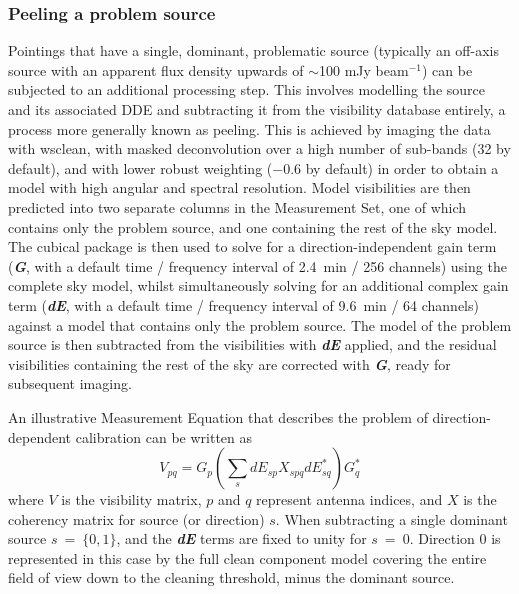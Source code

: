 \documentclass[usenatbib,usedcolumn]{mnras}
\begin{document}
\subsubsection{Peeling a problem source}
\label{sec:peeling}

Pointings that have a single, dominant, problematic source (typically an off-axis source with an apparent flux density upwards of $\sim$100 mJy beam$^{-1}$) can be subjected to an additional processing step. This involves modelling the source and its associated DDE and subtracting it from the visibility database entirely, a process more generally known as peeling. This is achieved by imaging the data with {\sc wsclean}, with masked deconvolution over a high number of sub-bands (32 by default), and with lower \citet{briggs1995} robust weighting ($-$0.6 by default) in order to obtain a model with high angular and spectral resolution. Model visibilities are then predicted into two separate columns in the Measurement Set, one of which contains only the problem source, and one containing the rest of the sky model. The {\sc cubical} package \citep{kenyon2018} is then used to solve for a direction-independent gain term (\textit{\textbf{G}}, with a default time / frequency interval of 2.4~min / 256 channels) using the complete sky model, whilst simultaneously solving for an additional complex gain term (\textit{\textbf{dE}}, with a default time / frequency interval of 9.6~min / 64 channels) against a model that contains only the problem source. The model of the problem source is then subtracted from the visibilities with \textit{\textbf{dE}} applied, and the residual visibilities containing the rest of the sky are corrected with \textit{\textbf{G}}, ready for subsequent imaging. 

An illustrative Measurement Equation \citep{smirnov2011a} that describes the problem of direction-dependent calibration can be written as
\begin{equation}
\label{eq:me}
V_{pq} = G_{p} \left( \sum_{s} dE_{sp} X_{spq} dE_{sq}^{*} \right) G_{q}^{*}
\end{equation}
where $V$ is the visibility matrix, $p$ and $q$ represent antenna indices, and $X$ is the coherency matrix for source (or direction) $s$. When subtracting a single dominant source $s~=~\{0,1\}$, and the \textit{\textbf{dE}} terms are fixed to unity for $s~=~0$. Direction 0 is represented in this case by the full clean component model covering the entire field of view down to the cleaning threshold, minus the dominant source.
\end{document}
